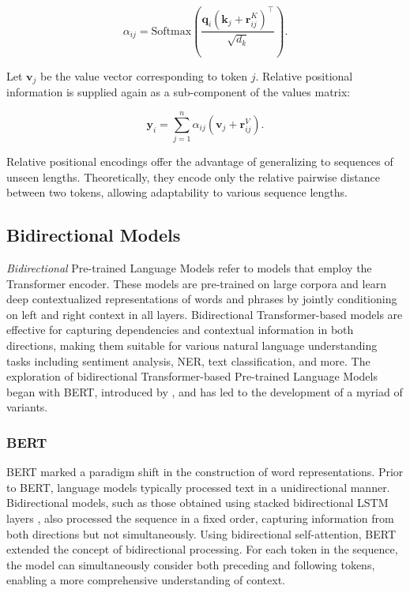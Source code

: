 \begin{equation}
    \alpha_{ij} = \mathrm{Softmax}\left(\frac{\bm{q}_i (\bm{k}_j + \bm{r}^K_{ij})^{\top}}{\sqrt{d_k}}\right).
\end{equation}

Let $\bm{v}_j$ be the value vector corresponding to token $j$. Relative positional information is supplied again as a sub-component of the values matrix:

\begin{equation}
    \bm{y}_i = \sum_{j=1}^n \alpha_{ij} (\bm{v}_j + \bm{r}^V_{ij}).
\end{equation}

Relative positional encodings offer the advantage of generalizing to sequences of unseen lengths. Theoretically, they encode only the relative pairwise distance between two tokens, allowing adaptability to various sequence lengths.

\subsection{Bidirectional Models}

\textit{Bidirectional} Pre-trained Language Models refer to models that employ the Transformer encoder. These models are pre-trained on large corpora and learn deep contextualized representations of words and phrases by jointly conditioning on left and right context in all layers. Bidirectional Transformer-based models are effective for capturing dependencies and contextual information in both directions, making them suitable for various natural language understanding tasks including sentiment analysis, \ac{NER}, text classification, and more. The exploration of bidirectional Transformer-based Pre-trained Language Models began with \ac{BERT}, introduced by \citet{devlin2018bert}, and has led to the development of a myriad of variants.

\subsubsection{BERT}

\ac{BERT} marked a paradigm shift in the construction of word representations.  
Prior to \ac{BERT}, language models typically processed text in a unidirectional manner. Bidirectional models, such as those obtained using stacked bidirectional \ac{LSTM} layers \citep{peters-etal-2018-deep}, also processed the sequence in a fixed order, capturing information from both directions but not simultaneously. 
Using bidirectional self-attention, \ac{BERT} extended the concept of bidirectional processing. For each token in the sequence, the model can simultaneously consider both preceding and following tokens, enabling a more comprehensive understanding of context.

